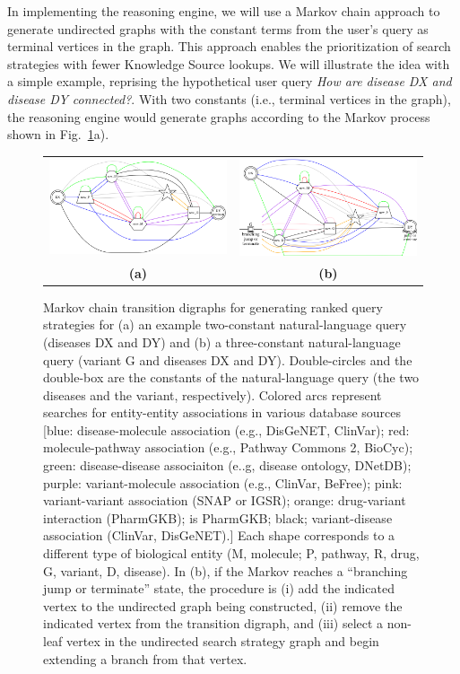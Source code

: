 \documentclass[11pt,notitlepage]{article}
\begin{document}
In implementing the reasoning engine, we will use a Markov chain approach to
generate undirected graphs with the constant terms from the user's query as
terminal vertices in the graph. This approach enables the
prioritization of search strategies with fewer Knowledge Source lookups.  We will
illustrate the idea with a simple example, reprising the hypothetical user query
{\em How are disease DX and disease DY connected?}. With two constants (i.e.,
terminal vertices in the graph), the reasoning engine would generate graphs according to the Markov process
shown in Fig.~\ref{fig:mp}a).
\begin{figure}[h!]
  \begin{tabular}{cc}
    \includegraphics[width=3in]{markov1.png} &
    \includegraphics[width=3in]{markov2.png} \\
                    {\bf (a)} & {\bf (b)}
  \end{tabular}
  \caption{Markov chain transition digraphs for generating ranked query
    strategies for (a) an example two-constant natural-language query (diseases
    DX and DY) and (b) a three-constant natural-language query (variant G and
    diseases DX and DY). Double-circles and the double-box are the constants of
    the natural-language query (the two diseases and the variant, respectively).
    Colored arcs represent searches for entity-entity associations in various
    database sources [blue: disease-molecule association (e.g., DisGeNET,
      ClinVar); red: molecule-pathway association (e.g., Pathway Commons 2,
      BioCyc); green: disease-disease associaiton (e..g, disease ontology,
      DNetDB); purple: variant-molecule association (e.g., ClinVar, BeFree);
      pink: variant-variant association (SNAP or IGSR); orange: drug-variant
      interaction (PharmGKB); is PharmGKB; black; variant-disease association
      (ClinVar, DisGeNET).] Each shape corresponds to a different type of
    biological entity (M, molecule; P, pathway, R, drug, G, variant, D,
    disease). In (b), if the Markov reaches a ``branching jump or terminate''
    state, the procedure is (i) add the indicated vertex to the undirected graph
    being constructed, (ii) remove the indicated vertex from the transition
    digraph, and (iii) select a non-leaf vertex in the undirected search
    strategy graph and begin extending a branch from that vertex.}
  \label{fig:mp}    
\end{figure}
\end{document}
